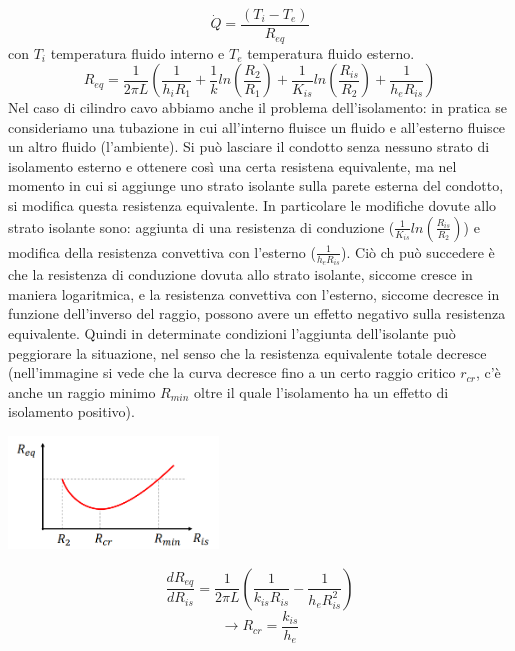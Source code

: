 \[
    \dot{Q} = \frac{(T_i - T_e)}{R_{eq}}
\]
con $T_i$ temperatura fluido interno e $T_e$ temperatura fluido esterno.
\[
    R_{eq} = \frac{1}{2\pi L}\left( \frac{1}{h_i R_1} + \frac{1}{k} ln \left(\frac{R_2}{R_1}\right) + \frac{1}{K_{is}} ln \left(\frac{R_{is}}{R_2}\right) + \frac{1}{h_eR_{is}}\right)
\]
Nel caso di cilindro cavo abbiamo anche il problema dell'isolamento: in pratica se consideriamo una tubazione in cui all'interno fluisce un fluido e all'esterno fluisce un altro fluido (l'ambiente). Si può lasciare il condotto senza nessuno strato di isolamento esterno e ottenere così una certa resistena equivalente, ma nel momento in cui si aggiunge uno strato isolante sulla parete esterna del condotto, si modifica questa resistenza equivalente. In particolare le modifiche dovute allo strato isolante sono: aggiunta di una resistenza di conduzione ($ \frac{1}{K_{is}} ln \left(\frac{R_{is}}{R_2}\right)$) e modifica della resistenza convettiva con l'esterno ($\frac{1}{h_eR_{is}}$). Ciò ch può succedere è che la resistenza di conduzione dovuta allo strato isolante, siccome cresce in maniera logaritmica, e la resistenza convettiva con l'esterno, siccome decresce in funzione dell'inverso del raggio, possono avere un effetto negativo sulla resistenza equivalente. Quindi in determinate condizioni l'aggiunta dell'isolante può peggiorare la situazione, nel senso che la resistenza equivalente totale decresce (nell'immagine si vede che la curva decresce fino a un certo raggio critico $r_{cr}$, c'è anche un raggio minimo $R_{min}$ oltre il quale l'isolamento ha un effetto di isolamento positivo).
\begin{center}
    \includegraphics[height=3cm]{../L10/img10.PNG}
\end{center}
\[
    \frac{dR_{eq}}{dR_{is}} = \frac{1}{2 \pi L} \left(\frac{1}{k_{is} R_{is}} - \frac{1}{h_e R_{is}^2}\right)
\]
\[
    \rightarrow R_{cr} = \frac{k_{is}}{h_e}
\]

